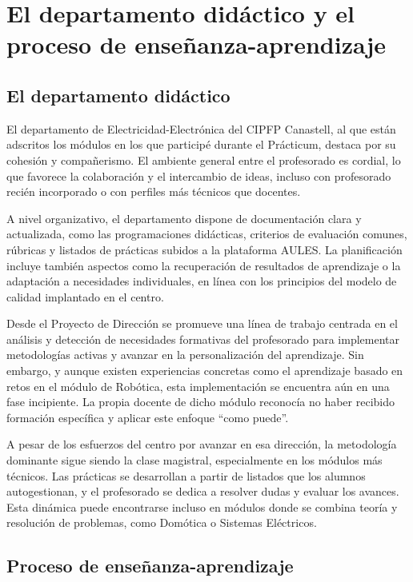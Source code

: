 \chapter{El departamento didáctico y el proceso de enseñanza-aprendizaje}

\section{El departamento didáctico}
El departamento de Electricidad-Electrónica del CIPFP Canastell, al que están adscritos los módulos en los que participé durante el Prácticum, destaca por su cohesión y compañerismo. El ambiente general entre el profesorado es cordial, lo que favorece la colaboración y el intercambio de ideas, incluso con profesorado recién incorporado o con perfiles más técnicos que docentes.

A nivel organizativo, el departamento dispone de documentación clara y actualizada, como las programaciones didácticas, criterios de evaluación comunes, rúbricas y listados de prácticas subidos a la plataforma AULES. La planificación incluye también aspectos como la recuperación de resultados de aprendizaje o la adaptación a necesidades individuales, en línea con los principios del modelo de calidad implantado en el centro.

Desde el Proyecto de Dirección se promueve una línea de trabajo centrada en el análisis y detección de necesidades formativas del profesorado para implementar metodologías activas y avanzar en la personalización del aprendizaje. Sin embargo, y aunque existen experiencias concretas como el aprendizaje basado en retos en el módulo de Robótica, esta implementación se encuentra aún en una fase incipiente. La propia docente de dicho módulo reconocía no haber recibido formación específica y aplicar este enfoque “como puede”.

A pesar de los esfuerzos del centro por avanzar en esa dirección, la metodología dominante sigue siendo la clase magistral, especialmente en los módulos más técnicos. Las prácticas se desarrollan a partir de listados que los alumnos autogestionan, y el profesorado se dedica a resolver dudas y evaluar los avances. Esta dinámica puede encontrarse incluso en módulos donde se combina teoría y resolución de problemas, como Domótica o Sistemas Eléctricos.


\section{Proceso de enseñanza-aprendizaje}

